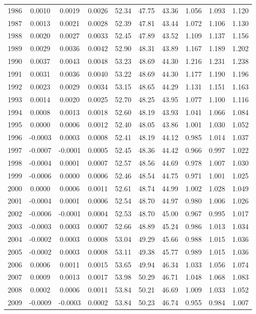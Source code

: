 \begin{tabular}{cccccccccc}
  1986 & 0.0010 & 0.0019 & 0.0026 & 52.34 & 47.75 & 43.36 & 1.056 & 1.093 & 1.120 \\ 
  1987 & 0.0013 & 0.0021 & 0.0028 & 52.39 & 47.81 & 43.44 & 1.072 & 1.106 & 1.130 \\ 
  1988 & 0.0020 & 0.0027 & 0.0033 & 52.45 & 47.89 & 43.52 & 1.109 & 1.137 & 1.156 \\ 
  1989 & 0.0029 & 0.0036 & 0.0042 & 52.90 & 48.31 & 43.89 & 1.167 & 1.189 & 1.202 \\ 
  1990 & 0.0037 & 0.0043 & 0.0048 & 53.23 & 48.69 & 44.30 & 1.216 & 1.231 & 1.238 \\ 
  1991 & 0.0031 & 0.0036 & 0.0040 & 53.22 & 48.69 & 44.30 & 1.177 & 1.190 & 1.196 \\ 
  1992 & 0.0023 & 0.0029 & 0.0034 & 53.15 & 48.65 & 44.29 & 1.131 & 1.151 & 1.163 \\ 
  1993 & 0.0014 & 0.0020 & 0.0025 & 52.70 & 48.25 & 43.95 & 1.077 & 1.100 & 1.116 \\ 
  1994 & 0.0008 & 0.0013 & 0.0018 & 52.60 & 48.19 & 43.93 & 1.041 & 1.066 & 1.084 \\ 
  1995 & 0.0000 & 0.0006 & 0.0012 & 52.40 & 48.05 & 43.86 & 1.001 & 1.030 & 1.052 \\ 
  1996 & -0.0003 & 0.0003 & 0.0008 & 52.41 & 48.19 & 44.12 & 0.985 & 1.014 & 1.037 \\ 
  1997 & -0.0007 & -0.0001 & 0.0005 & 52.45 & 48.36 & 44.42 & 0.966 & 0.997 & 1.022 \\ 
  1998 & -0.0004 & 0.0001 & 0.0007 & 52.57 & 48.56 & 44.69 & 0.978 & 1.007 & 1.030 \\ 
  1999 & -0.0006 & 0.0000 & 0.0006 & 52.46 & 48.54 & 44.75 & 0.971 & 1.001 & 1.025 \\ 
  2000 & 0.0000 & 0.0006 & 0.0011 & 52.61 & 48.74 & 44.99 & 1.002 & 1.028 & 1.049 \\ 
  2001 & -0.0004 & 0.0001 & 0.0006 & 52.54 & 48.70 & 44.97 & 0.980 & 1.006 & 1.026 \\ 
  2002 & -0.0006 & -0.0001 & 0.0004 & 52.53 & 48.70 & 45.00 & 0.967 & 0.995 & 1.017 \\ 
  2003 & -0.0003 & 0.0003 & 0.0007 & 52.66 & 48.89 & 45.24 & 0.986 & 1.013 & 1.034 \\ 
  2004 & -0.0002 & 0.0003 & 0.0008 & 53.04 & 49.29 & 45.66 & 0.988 & 1.015 & 1.036 \\ 
  2005 & -0.0002 & 0.0003 & 0.0008 & 53.11 & 49.38 & 45.77 & 0.989 & 1.015 & 1.036 \\ 
  2006 & 0.0006 & 0.0011 & 0.0015 & 53.65 & 49.94 & 46.34 & 1.033 & 1.056 & 1.074 \\ 
  2007 & 0.0009 & 0.0013 & 0.0017 & 53.98 & 50.29 & 46.71 & 1.048 & 1.068 & 1.083 \\ 
  2008 & 0.0002 & 0.0006 & 0.0011 & 53.84 & 50.21 & 46.69 & 1.009 & 1.033 & 1.052 \\ 
  2009 & -0.0009 & -0.0003 & 0.0002 & 53.84 & 50.23 & 46.74 & 0.955 & 0.984 & 1.007 \\ 
   \hline
\end{tabular}
